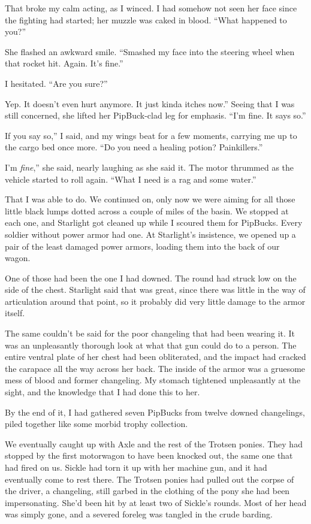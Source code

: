 That broke my calm acting, as I winced. I had somehow not seen her face since the fighting had started; her muzzle was caked in blood. “What happened to you?”

She flashed an awkward smile. “Smashed my face into the steering wheel when that rocket hit. Again. It’s fine.”

I hesitated. “Are you sure?”

\leavevmode{}Yep. It doesn’t even hurt anymore. It just kinda itches now.” Seeing that I was still concerned, she lifted her PipBuck-clad leg for emphasis. “I’m fine. It says so.”

\leavevmode{}If you say so,” I said, and my wings beat for a few moments, carrying me up to the cargo bed once more. “Do you need a healing potion? Painkillers.”

\leavevmode{}I’m \textit{fine},” she said, nearly laughing as she said it. The motor thrummed as the vehicle started to roll again. “What I need is a rag and some water.”

That I was able to do. We continued on, only now we were aiming for all those little black lumps dotted across a couple of miles of the basin. We stopped at each one, and Starlight got cleaned up while I scoured them for PipBucks. Every soldier without power armor had one. At Starlight’s insistence, we opened up a pair of the least damaged power armors, loading them into the back of our wagon.

One of those had been the one I had downed. The round had struck low on the side of the chest. Starlight said that was great, since there was little in the way of articulation around that point, so it probably did very little damage to the armor itself.

The same couldn’t be said for the poor changeling that had been wearing it. It was an unpleasantly thorough look at what that gun could do to a person. The entire ventral plate of her chest had been obliterated, and the impact had cracked the carapace all the way across her back. The inside of the armor was a gruesome mess of blood and former changeling. My stomach tightened unpleasantly at the sight, and the knowledge that I had done this to her.

By the end of it, I had gathered seven PipBucks from twelve downed changelings, piled together like some morbid trophy collection.

We eventually caught up with Axle and the rest of the Trotsen ponies. They had stopped by the first motorwagon to have been knocked out, the same one that had fired on us. Sickle had torn it up with her machine gun, and it had eventually come to rest there. The Trotsen ponies had pulled out the corpse of the driver, a changeling, still garbed in the clothing of the pony she had been impersonating. She’d been hit by at least two of Sickle’s rounds. Most of her head was simply gone, and a severed foreleg was tangled in the crude barding.

